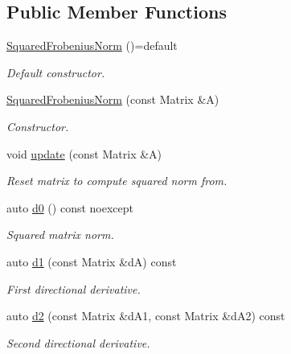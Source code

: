 \subsection*{Public Member Functions}
\begin{DoxyCompactItemize}
\item 
\hyperlink{structFunG_1_1LinearAlgebra_1_1SquaredFrobeniusNorm_ae9dfaea546dd55106ab886a10a255792}{Squared\+Frobenius\+Norm} ()=default
\begin{DoxyCompactList}\small\item\em Default constructor. \end{DoxyCompactList}\item 
\hyperlink{structFunG_1_1LinearAlgebra_1_1SquaredFrobeniusNorm_af33cdb4a7282ceb03b707ff7fa85ebe4}{Squared\+Frobenius\+Norm} (const Matrix \&A)
\begin{DoxyCompactList}\small\item\em Constructor. \end{DoxyCompactList}\item 
void \hyperlink{structFunG_1_1LinearAlgebra_1_1SquaredFrobeniusNorm_ac4c6dbd6c3beb28d1f77b3e1367d70b6}{update} (const Matrix \&A)
\begin{DoxyCompactList}\small\item\em Reset matrix to compute squared norm from. \end{DoxyCompactList}\item 
auto \hyperlink{structFunG_1_1LinearAlgebra_1_1SquaredFrobeniusNorm_af0315a30be696111d572313dc16ef0f5}{d0} () const noexcept
\begin{DoxyCompactList}\small\item\em Squared matrix norm. \end{DoxyCompactList}\item 
auto \hyperlink{structFunG_1_1LinearAlgebra_1_1SquaredFrobeniusNorm_aba96a8b0e500268388d8dc2751188673}{d1} (const Matrix \&d\+A) const 
\begin{DoxyCompactList}\small\item\em First directional derivative. \end{DoxyCompactList}\item 
auto \hyperlink{structFunG_1_1LinearAlgebra_1_1SquaredFrobeniusNorm_a052a1615f0a6f2a0e66dba2370f7e255}{d2} (const Matrix \&d\+A1, const Matrix \&d\+A2) const 
\begin{DoxyCompactList}\small\item\em Second directional derivative. \end{DoxyCompactList}\end{DoxyCompactItemize}


